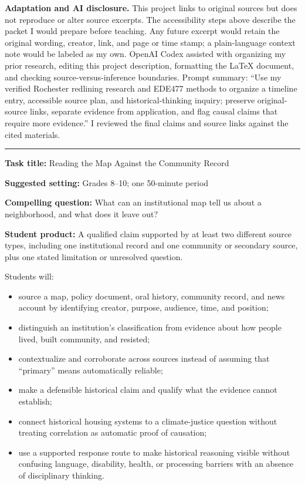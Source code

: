 \documentclass[11pt]{article}
\newcommand{\projectsection}[1]{\par\Needspace{5\baselineskip}\addvspace{0.10in}\noindent{\Large\bfseries\color{PrimaryRed}#1}\par\vspace{0.02in}\color{DeepNavy}\hrule\color{black}\vspace{0.08in}}
\newcommand{\subsectiontitle}[1]{\par\Needspace{4\baselineskip}\addvspace{0.08in}\noindent{\large\bfseries\color{DeepNavy}#1}\par}
\begin{document}
\begin{cautionbox}
\textbf{Adaptation and AI disclosure.} This project links to original sources but does not reproduce or alter source excerpts. The accessibility steps above describe the packet I would prepare before teaching. Any future excerpt would retain the original wording, creator, link, and page or time stamp; a plain-language context note would be labeled as my own. OpenAI Codex assisted with organizing my prior research, editing this project description, formatting the LaTeX document, and checking source-versus-inference boundaries. Prompt summary: ``Use my verified Rochester redlining research and EDE477 methods to organize a timeline entry, accessible source plan, and historical-thinking inquiry; preserve original-source links, separate evidence from application, and flag causal claims that require more evidence.'' I reviewed the final claims and source links against the cited materials.
\end{cautionbox}

\projectsection{3. Historical-Thinking Task}
\begin{focusbox}
\textbf{Task title:} Reading the Map Against the Community Record\par
\textbf{Suggested setting:} Grades 8--10; one 50-minute period\par
\textbf{Compelling question:} What can an institutional map tell us about a neighborhood, and what does it leave out?\par
\textbf{Student product:} A qualified claim supported by at least two different source types, including one institutional record and one community or secondary source, plus one stated limitation or unresolved question.
\end{focusbox}

\subsectiontitle{Learning goals}
Students will:
\begin{itemize}
  \item source a map, policy document, oral history, community record, and news account by identifying creator, purpose, audience, time, and position;
  \item distinguish an institution's classification from evidence about how people lived, built community, and resisted;
  \item contextualize and corroborate across sources instead of assuming that ``primary'' means automatically reliable;
  \item make a defensible historical claim and qualify what the evidence cannot establish;
  \item connect historical housing systems to a climate-justice question without treating correlation as automatic proof of causation;
  \item use a supported response route to make historical reasoning visible without confusing language, disability, health, or processing barriers with an absence of disciplinary thinking.
\end{itemize}
\end{document}
